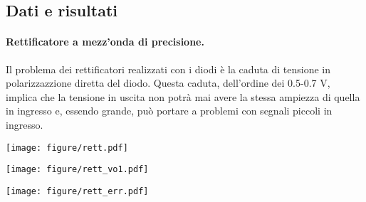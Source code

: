 \subsection{Dati e risultati}

\paragraph{Rettificatore a mezz'onda di precisione.}

Il problema dei rettificatori realizzati con i diodi è la caduta di tensione in polarizzazzione
diretta del diodo. Questa caduta, dell'ordine dei 0.5-0.7 V, implica che la tensione in uscita non
potrà mai avere la stessa ampiezza di quella in ingresso e, essendo grande, può portare a
problemi con segnali piccoli in ingresso.

\begin{SCfigure*}[][p]
    \texttt{[image: figure/rett.pdf]}
    \caption{Input e output ($V_o$) del raddrizzatore a mezz'onda semplice (circuito \ref{fig:raddrizzatore5}).
        L'input è una sinusoide di 1 Vpp a 500 Hz.
        È visibile un certo ritardo del circuito a seguire l'andamento dell'ingresso, quando questa
        da negativo diventa positivo. Rispetto ad un raddrizzatore a diodi non è presente un offset di 0.6 V.}
    \label{fig:rett_graph5}
\end{SCfigure*}

\begin{SCfigure*}[][p]
    \texttt{[image: figure/rett\_vo1.pdf]}
    \caption{Input e tensione $V_{o1}$ all'uscita dell'amplificatore operazionale nel circuito \ref{fig:raddrizzatore5}.
        Si vede come l'operazionale vada in saturazione negativa (circa -13 V) e come impieghi un certo tempo a tornare in
        funzionamento lineare (per esempio al tempo t = 0). È inoltre visibile l'effetto della caduta in diretta del
        diodo, che ammonta a circa 0.4 V nel grafico. L'input è sempre una sinusoide 1 Vpp a 500 Hz.}
    \label{fig:rett_vo15}
\end{SCfigure*}

\begin{SCfigure*}[][p]
    \texttt{[image: figure/rett\_err.pdf]}
    \caption{Questa immagine è un'ingrandimento delle precedenti due (figure \ref{fig:rett_graph5} e \ref{fig:rett_vo15})
        nella zona dove avviene il ritardo. Il ritardo è circa 50 $\mu$s, inspiegabile con il solo slew rate limitato
        dell'operazionale. Nel grafico in basso, la parte iniziale della curva nera (la parte meno pendente) è il momento
        in cui l'operazionale spende tempo ad uscire dalla saturazione.}
    \label{fig:rett_err5}
\end{SCfigure*}

